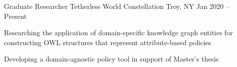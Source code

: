 
\begin{cventries}

  \cventry
  {Graduate Researcher}
  {Tetherless World Constellation}
  {Troy, NY}
  {Jan 2020 -- Present}
  {
    \begin{cvitems}
      \item {
                  Researching the application of domain-specific knowledge graph entities for constructing OWL structures that represent attribute-based policies
            }
      \item {
                  Developing a domain-agnostic policy tool in support of Master's thesis
            }
    \end{cvitems}
  }
\end{cventries}
